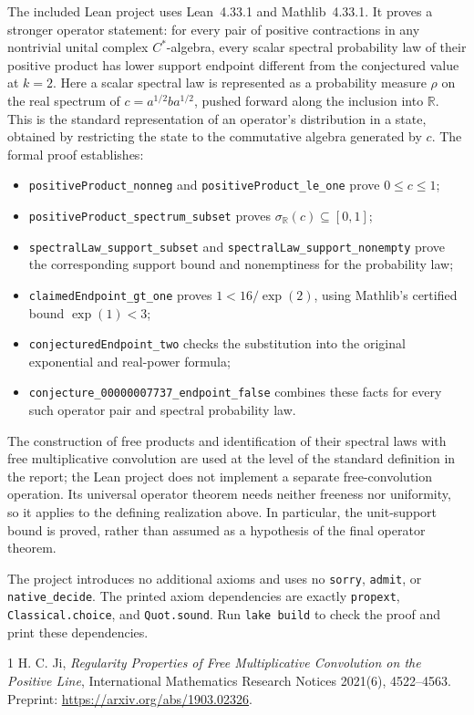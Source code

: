 \documentclass[11pt]{article}
\begin{document}
The included Lean project uses Lean~4.33.1 and Mathlib~4.33.1.
It proves a stronger operator statement: for every pair of positive
contractions in any nontrivial unital complex $C^*$-algebra, every scalar
spectral probability law of their positive product has lower support endpoint
different from the conjectured value at $k=2$.
Here a scalar spectral law is represented as a probability measure $\rho$
on the real spectrum of $c=a^{1/2}ba^{1/2}$, pushed forward along the
inclusion into $\mathbb R$. This is the standard representation of an
operator's distribution in a state, obtained by restricting the state to
the commutative algebra generated by $c$.
The formal proof establishes:
\begin{itemize}
  \item \texttt{positiveProduct\_nonneg} and
        \texttt{positiveProduct\_le\_one} prove $0\le c\le1$;
  \item \texttt{positiveProduct\_spectrum\_subset} proves
        $\sigma_{\mathbb R}(c)\subseteq[0,1]$;
  \item \texttt{spectralLaw\_support\_subset} and
        \texttt{spectralLaw\_support\_nonempty} prove the corresponding
        support bound and nonemptiness for the probability law;
  \item \texttt{claimedEndpoint\_gt\_one} proves $1<16/\exp(2)$, using
        Mathlib's certified bound $\exp(1)<3$;
  \item \texttt{conjecturedEndpoint\_two} checks the substitution into the
        original exponential and real-power formula;
  \item \texttt{conjecture\_00000007737\_endpoint\_false} combines these
        facts for every such operator pair and spectral probability law.
\end{itemize}
The construction of free products and identification of their spectral laws
with free multiplicative convolution are used at the level of the standard
definition in the report; the Lean project does not implement a separate
free-convolution operation. Its universal operator theorem needs neither
freeness nor uniformity, so it applies to the defining realization above.
In particular, the unit-support bound is proved, rather than assumed as a
hypothesis of the final operator theorem.

The project introduces no additional axioms and uses no \texttt{sorry},
\texttt{admit}, or \texttt{native\_decide}. The printed axiom dependencies
are exactly \texttt{propext}, \texttt{Classical.choice}, and
\texttt{Quot.sound}. Run \texttt{lake build} to check the proof and print
these dependencies.

\begin{thebibliography}{1}
 H. C. Ji, \emph{Regularity Properties of Free Multiplicative
Convolution on the Positive Line}, International Mathematics Research
Notices 2021(6), 4522--4563. Preprint:
\url{https://arxiv.org/abs/1903.02326}.
\end{thebibliography}
\end{document}

